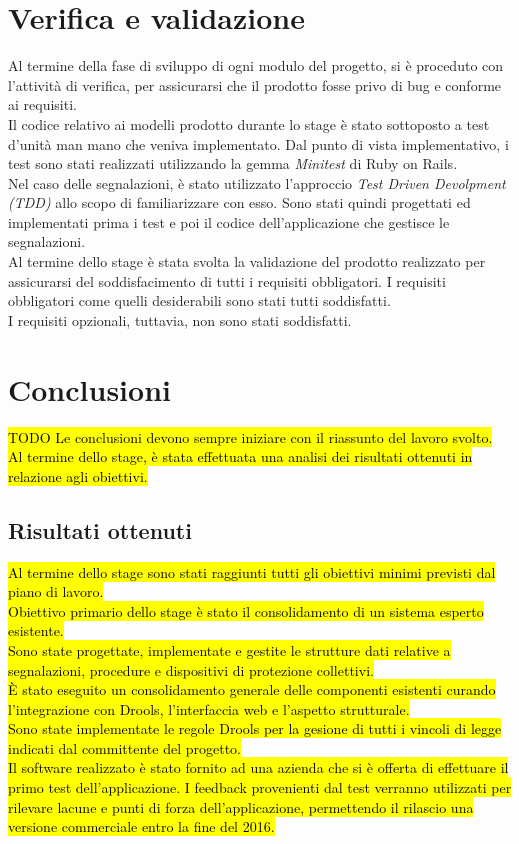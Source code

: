 \newpage
\section{Verifica e validazione}
	Al termine della fase di sviluppo di ogni modulo del progetto, si è proceduto con l'attività di verifica, per assicurarsi che il prodotto fosse privo di bug e conforme ai requisiti.\\
	Il codice relativo ai modelli prodotto durante lo stage è stato sottoposto a test d'unità man mano che veniva implementato. Dal punto di vista implementativo, i test sono stati realizzati utilizzando la gemma \textit{Minitest} di Ruby on Rails.\\
	Nel caso delle segnalazioni, è stato utilizzato l'approccio \textit{Test Driven Devolpment (TDD)} allo scopo di familiarizzare con esso. Sono stati quindi progettati ed implementati prima i test e poi il codice dell'applicazione che gestisce le segnalazioni.\\
	Al termine dello stage è stata svolta la validazione del prodotto realizzato per assicurarsi del soddisfacimento di tutti i requisiti obbligatori. I requisiti obbligatori come quelli desiderabili sono stati tutti soddisfatti.\\
	I requisiti opzionali, tuttavia,  non sono stati soddisfatti. 
	
	
	
\newpage
\section{Conclusioni}
\hl{TODO Le conclusioni devono sempre iniziare con il riassunto del lavoro svolto. }\\

	\hl{Al termine dello stage, è stata effettuata una analisi dei risultati ottenuti in relazione agli obiettivi.}
	
	\subsection{Risultati ottenuti}
	\hl{Al termine dello stage sono stati raggiunti tutti gli obiettivi minimi previsti dal piano di lavoro.\\
		Obiettivo primario dello stage è stato il consolidamento di un sistema esperto esistente. \\
		Sono state progettate, implementate e gestite le strutture dati relative a segnalazioni, procedure e dispositivi di protezione collettivi. \\
		È stato eseguito un consolidamento generale delle componenti esistenti curando l'integrazione con Drools, l'interfaccia web e l'aspetto strutturale.\\
		Sono state implementate le regole Drools per la gesione di tutti i vincoli di legge indicati dal committente del progetto.\\
		Il software realizzato è stato fornito ad una azienda che si è offerta di effettuare il primo test dell'applicazione. I feedback provenienti dal test verranno utilizzati per rilevare lacune e punti di forza dell'applicazione, permettendo il rilascio una versione commerciale entro la fine del 2016.
}
